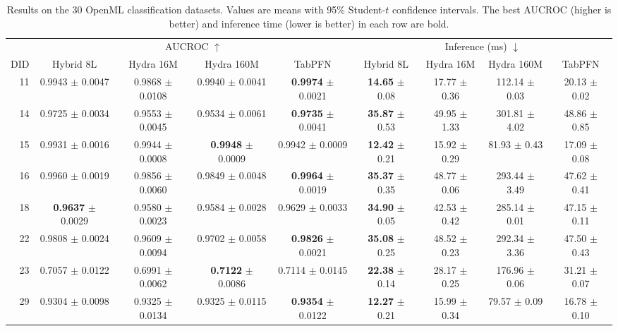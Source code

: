 \begin{table}[t]
\centering
\caption{Results on the 30 OpenML classification datasets. Values are means
with 95\% Student-$t$ confidence intervals. The best AUCROC (higher is
better) and inference time (lower is better) in each row are bold.}
\label{tab:openml_auc_inference}
\setlength{\tabcolsep}{3.2pt}
\renewcommand{\arraystretch}{1.05}
\scriptsize
\begin{tabular}{@{}rcccc@{\hspace{5pt}}cccc@{}}
\toprule
& \multicolumn{4}{c}{AUCROC $\uparrow$} & \multicolumn{4}{c}{Inference (ms) $\downarrow$} \\
\cmidrule(lr){2-5}\cmidrule(lr){6-9}
DID & Hybrid 8L & Hydra 16M & Hydra 160M & TabPFN & Hybrid 8L & Hydra 16M & Hydra 160M & TabPFN \\
\midrule
11 & 0.9943 $\pm$ 0.0047 & 0.9868 $\pm$ 0.0108 & 0.9940 $\pm$ 0.0041 & \textbf{0.9974} $\pm$ 0.0021 & \textbf{14.65} $\pm$ 0.08 & 17.77 $\pm$ 0.36 & 112.14 $\pm$ 0.03 & 20.13 $\pm$ 0.02 \\
14 & 0.9725 $\pm$ 0.0034 & 0.9553 $\pm$ 0.0045 & 0.9534 $\pm$ 0.0061 & \textbf{0.9735} $\pm$ 0.0041 & \textbf{35.87} $\pm$ 0.53 & 49.95 $\pm$ 1.33 & 301.81 $\pm$ 4.02 & 48.86 $\pm$ 0.85 \\
15 & 0.9931 $\pm$ 0.0016 & 0.9944 $\pm$ 0.0008 & \textbf{0.9948} $\pm$ 0.0009 & 0.9942 $\pm$ 0.0009 & \textbf{12.42} $\pm$ 0.21 & 15.92 $\pm$ 0.29 & 81.93 $\pm$ 0.43 & 17.09 $\pm$ 0.08 \\
16 & 0.9960 $\pm$ 0.0019 & 0.9856 $\pm$ 0.0060 & 0.9849 $\pm$ 0.0048 & \textbf{0.9964} $\pm$ 0.0019 & \textbf{35.37} $\pm$ 0.35 & 48.77 $\pm$ 0.06 & 293.44 $\pm$ 3.49 & 47.62 $\pm$ 0.41 \\
18 & \textbf{0.9637} $\pm$ 0.0029 & 0.9580 $\pm$ 0.0023 & 0.9584 $\pm$ 0.0028 & 0.9629 $\pm$ 0.0033 & \textbf{34.90} $\pm$ 0.05 & 42.53 $\pm$ 0.42 & 285.14 $\pm$ 0.01 & 47.15 $\pm$ 0.11 \\
22 & 0.9808 $\pm$ 0.0024 & 0.9609 $\pm$ 0.0094 & 0.9702 $\pm$ 0.0058 & \textbf{0.9826} $\pm$ 0.0021 & \textbf{35.08} $\pm$ 0.25 & 48.52 $\pm$ 0.23 & 292.34 $\pm$ 3.36 & 47.50 $\pm$ 0.43 \\
23 & 0.7057 $\pm$ 0.0122 & 0.6991 $\pm$ 0.0062 & \textbf{0.7122} $\pm$ 0.0086 & 0.7114 $\pm$ 0.0145 & \textbf{22.38} $\pm$ 0.14 & 28.17 $\pm$ 0.25 & 176.96 $\pm$ 0.06 & 31.21 $\pm$ 0.07 \\
29 & 0.9304 $\pm$ 0.0098 & 0.9325 $\pm$ 0.0134 & 0.9325 $\pm$ 0.0115 & \textbf{0.9354} $\pm$ 0.0122 & \textbf{12.27} $\pm$ 0.21 & 15.99 $\pm$ 0.34 & 79.57 $\pm$ 0.09 & 16.78 $\pm$ 0.10 \\

\end{tabular}
\end{table}
